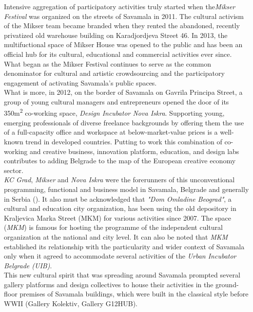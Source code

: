 \documentclass[11pt]{report}
\begin{document}
{{{{Intensive aggregation of participatory activities truly started when the\textit{Mikser Festival} was organized on the streets of Savamala in 2011. The cultural activism of the Mikser team became branded when they rented the abandoned, recently privatized old warehouse building on Karadjordjeva Street 46. In 2013, the multifuctional space of Mikser House was opened to the public and has been an official hub for its cultural, educational and commercial activities ever since. What began as the Mikser Festival continues to serve as the common denominator for cultural and artistic crowdsourcing and the participatory engagement of activating Savamala’s public spaces.
\\
What is more, in 2012, on the border of Savamala on Gavrila Principa Street, a group of young cultural managers and entrepreneurs opened the door of its 350m\textsuperscript{2} co-working space, \textit{Design Incubator Nova Iskra}. Supporting young, emerging professionals of diverse freelance backgrounds by offering them the use of a full-capacity office and workspace at below-market-value prices is a well-known trend in  developed countries. 
Putting to work this combination of co-working and creative business, innovation platform, education, and design labs contributes to adding Belgrade to the map of the European creative economy sector. 
\\

\textit{KC Grad}, \textit{Mikser} and \textit{Nova Iskra} were the forerunners of this unconventional programming, functional and business model in Savamala, Belgrade and generally in Serbia (\href{Doytchinov}{\citealt{doytchinov_urban_2015}}). %
It also must be acknowledged that \textit{"Dom Omladine Beograd"}, a cultural and education city organization, has been using the old depository in Kraljevica Marka Street (MKM) for various activities since 2007.
The space (\textit{MKM}) is famous for hosting the programme of the independent cultural organization at the national and city level.
It can also be noted that \textit{MKM} established its relationship with the particularity and wider context of Savamala only when it agreed to accommodate several activities of the \textit{Urban Incubator Belgrade (UIB)}.
\\

This new cultural spirit that was spreading around Savamala prompted several gallery platforms and design collectives to house their activities in the ground-floor premises of Savamala buildings, which were built in the classical style before WWII (Gallery Kolektiv, Gallery G12HUB).
\\

}}}}
\end{document}
